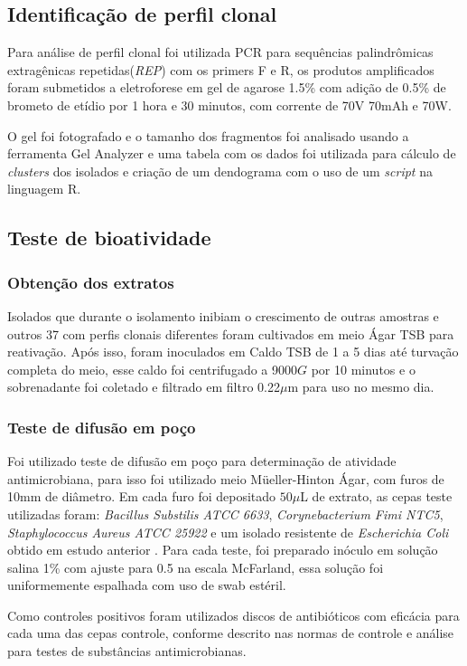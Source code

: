 \subsection{Identificação de perfil clonal}
Para análise de perfil clonal foi utilizada PCR para sequências palindrômicas
extragênicas repetidas(\textit{REP}) com os primers F e R, os produtos amplificados
foram submetidos a eletroforese em gel de agarose 1.5\% com adição de 0.5\% de
brometo de etídio por 1 hora e 30 minutos, com corrente de 70V 70mAh e 70W.

O gel foi fotografado e o tamanho dos fragmentos foi analisado usando a ferramenta
Gel Analyzer e uma tabela com os dados foi utilizada para cálculo de \textit{clusters}
dos isolados e criação de um dendograma com o uso de um \textit{script} na
linguagem R.

\subsection{Teste de bioatividade}
\subsubsection{Obtenção dos extratos}
Isolados que durante o isolamento inibiam o crescimento de outras amostras e outros 37
com perfis clonais diferentes foram cultivados em meio Ágar TSB para
reativação. Após isso, foram inoculados em Caldo TSB de 1 a 5 dias até turvação completa
do meio, esse caldo foi centrifugado a 9000$G$ por 10 minutos e o sobrenadante foi coletado
e filtrado em filtro 0.22$\mu$m para uso no mesmo dia.
\subsubsection{Teste de difusão em poço}
Foi utilizado teste de difusão em poço para determinação de atividade antimicrobiana,
para isso foi utilizado meio Müeller-Hinton Ágar, com furos de 10mm de diâmetro.
Em cada furo foi depositado $50\mu$L de extrato, as cepas teste utilizadas foram:
\textit{Bacillus Substilis ATCC 6633}, \textit{Corynebacterium Fimi NTC5}, \textit{Staphylococcus Aureus ATCC 25922}
e um isolado resistente de \textit{Escherichia Coli} obtido em estudo anterior \cite{dhara2019}.
Para cada teste, foi preparado inóculo em solução salina 1\% com ajuste para 0.5
na escala McFarland, essa solução foi uniformemente espalhada com uso de swab estéril.

Como controles positivos foram utilizados discos de antibióticos com
eficácia para cada uma das cepas controle, conforme descrito nas normas de controle e
análise para testes de substâncias antimicrobianas\cite{clsi2020}.


